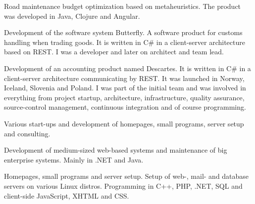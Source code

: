 \documentclass[10pt,a4paper]{altacv}
\begin{document}
\divider

Road maintenance budget optimization based on metaheuristics. The product was developed in Java, Clojure and Angular.

\divider

Development of the software system Butterfly. A software product for customs handling when trading goods. It is written in C\# in a client-server architecture based on REST. I was a developer and later on  architect and team lead.

\divider

Development of an accounting product named Descartes. It is written in C\# in a client-server architecture communicating by REST. It was launched in Norway, Iceland, Slovenia and Poland. I was part of the initial team and was involved in everything from project startup, architecture, infrastructure, quality assurance, source-control management, continuous integration and of course programming.

\divider

Various start-ups and development of homepages, small programs, server setup and consulting.

\divider

Development of medium-sized web-based systems and maintenance of big enterprise systems. Mainly in .NET and Java.

\divider

Homepages, small programs and server setup. Setup of web-, mail- and database servers on various Linux distros. Programming in C++, PHP, .NET, SQL and client-side JavaScript, XHTML and CSS.

\clearpage

\end{document}
